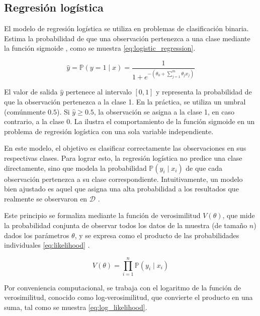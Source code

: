 \subsection{Regresión logística}
\label{sec:regresion_logistica}

El modelo de regresión logística se utiliza en problemas de clasificación binaria. Estima la probabilidad de que una observación pertenezca a una clase mediante la función sigmoide \cite{Bishop2006}, como se muestra \eqref{eq:logistic_regression}.

\begin{equation}
    \label{eq:logistic_regression}
    \hat{y} = \mathbb{P}\left(y=1 \mid x\right)  = \frac{1}{1 + e^{-\left(\theta_0 + \sum_{j=1}^{m} \theta_j x_j\right)}}
\end{equation}

El valor de salida $\hat{y}$ pertenece al intervalo $\left[0, 1\right]$ y representa la probabilidad de que la observación pertenezca a la clase 1. En la práctica, se utiliza un umbral (comúnmente $0.5$). Si $\hat{y} \geq 0.5$, la observación se asigna a la clase 1, en caso contrario, a la clase 0. La  ilustra el comportamiento de la función sigmoide en un problema de regresión logística con una sola variable independiente.


En este modelo, el objetivo es clasificar correctamente las observaciones en sus respectivas clases. Para lograr esto, la regresión logística no predice una clase directamente, sino que modela la probabilidad $\mathbb{P}(y_i \mid x_i)$ de que cada observación pertenezca a su clase correspondiente. Intuitivamente, un modelo bien ajustado es aquel que asigna una alta probabilidad a los resultados que realmente se observaron en $\mathcal{D}$ \cite{Bishop2006}.

Este principio se formaliza mediante la función de verosimilitud $V(\theta)$, que mide la probabilidad conjunta de observar todos los datos de la muestra (de tamaño $n$) dados los parámetros $\theta$, y se expresa como el producto de las probabilidades individuales \eqref{eq:likelihood} \cite{Bishop2006}.

\begin{equation}
    \label{eq:likelihood}
      V(\theta) = \prod_{i=1}^{n} \mathbb{P}(y_i \mid x_i)
\end{equation}

Por conveniencia computacional, se trabaja con el logaritmo de la función de verosimilitud, conocido como log-ve\-ro\-si\-mi\-li\-tud, que convierte el producto en una suma, tal como se muestra \eqref{eq:log_likelihood}.

